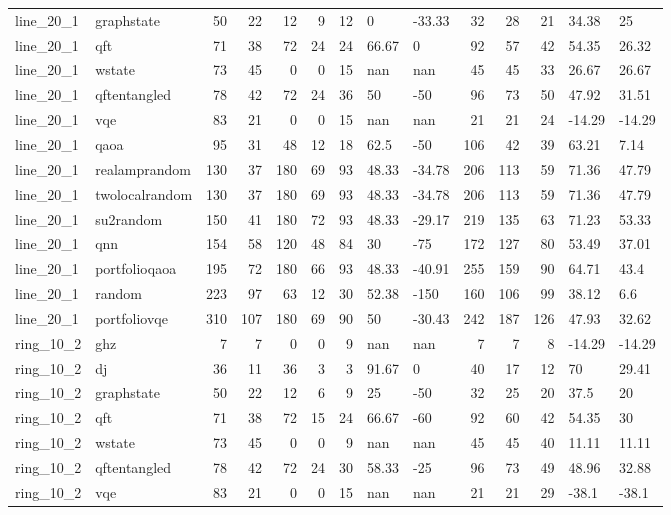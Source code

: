 \begin{longtable}{llrrrrrllrrrll}
line\_20\_1 & graphstate & 50 & 22 & 12 & 9 & 12 & 0 & -33.33 & 32 & 28 & 21 & 34.38 & 25 \\
line\_20\_1 & qft & 71 & 38 & 72 & 24 & 24 & 66.67 & 0 & 92 & 57 & 42 & 54.35 & 26.32 \\
line\_20\_1 & wstate & 73 & 45 & 0 & 0 & 15 & nan & nan & 45 & 45 & 33 & 26.67 & 26.67 \\
line\_20\_1 & qftentangled & 78 & 42 & 72 & 24 & 36 & 50 & -50 & 96 & 73 & 50 & 47.92 & 31.51 \\
line\_20\_1 & vqe & 83 & 21 & 0 & 0 & 15 & nan & nan & 21 & 21 & 24 & -14.29 & -14.29 \\
line\_20\_1 & qaoa & 95 & 31 & 48 & 12 & 18 & 62.5 & -50 & 106 & 42 & 39 & 63.21 & 7.14 \\
line\_20\_1 & realamprandom & 130 & 37 & 180 & 69 & 93 & 48.33 & -34.78 & 206 & 113 & 59 & 71.36 & 47.79 \\
line\_20\_1 & twolocalrandom & 130 & 37 & 180 & 69 & 93 & 48.33 & -34.78 & 206 & 113 & 59 & 71.36 & 47.79 \\
line\_20\_1 & su2random & 150 & 41 & 180 & 72 & 93 & 48.33 & -29.17 & 219 & 135 & 63 & 71.23 & 53.33 \\
line\_20\_1 & qnn & 154 & 58 & 120 & 48 & 84 & 30 & -75 & 172 & 127 & 80 & 53.49 & 37.01 \\
line\_20\_1 & portfolioqaoa & 195 & 72 & 180 & 66 & 93 & 48.33 & -40.91 & 255 & 159 & 90 & 64.71 & 43.4 \\
line\_20\_1 & random & 223 & 97 & 63 & 12 & 30 & 52.38 & -150 & 160 & 106 & 99 & 38.12 & 6.6 \\
line\_20\_1 & portfoliovqe & 310 & 107 & 180 & 69 & 90 & 50 & -30.43 & 242 & 187 & 126 & 47.93 & 32.62 \\
ring\_10\_2 & ghz & 7 & 7 & 0 & 0 & 9 & nan & nan & 7 & 7 & 8 & -14.29 & -14.29 \\
ring\_10\_2 & dj & 36 & 11 & 36 & 3 & 3 & 91.67 & 0 & 40 & 17 & 12 & 70 & 29.41 \\
ring\_10\_2 & graphstate & 50 & 22 & 12 & 6 & 9 & 25 & -50 & 32 & 25 & 20 & 37.5 & 20 \\
ring\_10\_2 & qft & 71 & 38 & 72 & 15 & 24 & 66.67 & -60 & 92 & 60 & 42 & 54.35 & 30 \\
ring\_10\_2 & wstate & 73 & 45 & 0 & 0 & 9 & nan & nan & 45 & 45 & 40 & 11.11 & 11.11 \\
ring\_10\_2 & qftentangled & 78 & 42 & 72 & 24 & 30 & 58.33 & -25 & 96 & 73 & 49 & 48.96 & 32.88 \\
ring\_10\_2 & vqe & 83 & 21 & 0 & 0 & 15 & nan & nan & 21 & 21 & 29 & -38.1 & -38.1 \\

\end{longtable}
